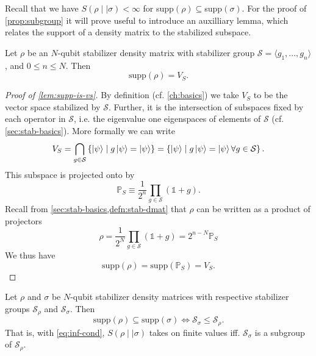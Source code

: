Recall that we have $S(\rho\mid\mid\sigma)<\infty$ for
supp$(\rho)\subseteq$supp$(\sigma)$. For the proof of \cref{prop:subgroup} it
will prove useful to introduce an auxilliary lemma, which relates the support
of a density matrix to the stabilized subspace.
\begin{lem}\label{lem:supp-is-vs}
  Let $\rho$ be an $N$-qubit stabilizer density matrix with stabilizer group
  $\mathcal{S} = \langle
  g_1, \ldots, g_n \rangle$, and $0\leq n \leq N$.
  Then \[ \mathrm{supp}(\rho) = V_{S}.\]
\end{lem}
\begin{proof}[Proof of \cref{lem:supp-is-vs}]
  By definition (cf. \cref{ch:basics}) we take $V_{S}$ to be the vector space
  stabilized by $\mathcal{S}$.  Further, it is the intersection of subspaces fixed by
  each operator in $\mathcal{S}$, i.e. the eigenvalue one eigenspaces of
  elements of $\mathcal{S}$
  (cf. \cref{sec:stab-basics}). More
  formally we can write
  \[ 
    V_S = \bigcap_{g \in \mathcal{S}}  \left\{\ket{\psi} \mid g\ket{\psi} =
    \ket{\psi}\right\} = \left\{\ket{\psi} \mid g\ket{\psi} =
  \ket{\psi} \forall g \in \mathcal{S}\right\}.
  \]
  This subspace is projected onto by
  \[ \mathbb{P}_S \equiv \frac{1}{2^n} \prod_{g\in \mathcal{S}} \left(\mathds{1} + g\right).\]
  Recall from \cref{sec:stab-basics,defn:stab-dmat} that $\rho$ can be written as a product of
  projectors
  \[ \rho = \frac{1}{2^N} \prod_{g \in \mathcal{S}} \left(\mathds{1} + g\right)
  = 2^{n-N} \mathbb{P}_S \]
  We thus have
  \[ \mathrm{supp}(\rho) = \mathrm{supp}(\mathbb{P}_S) = V_S. \]
\end{proof}

\begin{thm}\label{prop:subgroup}
  Let $\rho$ and $\sigma$ be $N$-qubit stabilizer density matrices with
  respective stabilizer groups $\mathcal{S}_\rho$ and $\mathcal{S}_\sigma$. Then
  \[ \mathrm{supp}(\rho)\subseteq \mathrm{supp}(\sigma) \Longleftrightarrow
  \mathcal{S}_\sigma \leq \mathcal{S}_\rho. \]
  That is, with \cref{eq:inf-cond}, $S(\rho\mid\mid\sigma)$ takes on finite
  values iff. $\mathcal{S}_\sigma$ is a
  subgroup of $\mathcal{S}_\rho$.
\end{thm}

